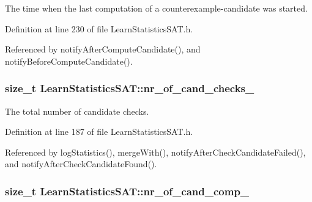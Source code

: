 The time when the last computation of a counterexample-\/candidate was started. 



Definition at line 230 of file Learn\-Statistics\-S\-A\-T.\-h.



Referenced by notify\-After\-Compute\-Candidate(), and notify\-Before\-Compute\-Candidate().

\hypertarget{classLearnStatisticsSAT_a1c3b6dff92cbcec06c944606c3555b64}{
\subsubsection[{nr\-\_\-of\-\_\-cand\-\_\-checks\-\_\-}]{\setlength{\rightskip}{0pt plus 5cm}size\-\_\-t Learn\-Statistics\-S\-A\-T\-::nr\-\_\-of\-\_\-cand\-\_\-checks\-\_\-\hspace{0.3cm}{\ttfamily [protected]}}}\label{classLearnStatisticsSAT_a1c3b6dff92cbcec06c944606c3555b64}


The total number of candidate checks. 



Definition at line 187 of file Learn\-Statistics\-S\-A\-T.\-h.



Referenced by log\-Statistics(), merge\-With(), notify\-After\-Check\-Candidate\-Failed(), and notify\-After\-Check\-Candidate\-Found().

\hypertarget{classLearnStatisticsSAT_a02de895c31e4c58396d5f07154e21561}{
\subsubsection[{nr\-\_\-of\-\_\-cand\-\_\-comp\-\_\-}]{\setlength{\rightskip}{0pt plus 5cm}size\-\_\-t Learn\-Statistics\-S\-A\-T\-::nr\-\_\-of\-\_\-cand\-\_\-comp\-\_\-\hspace{0.3cm}{\ttfamily [protected]}}}\label{classLearnStatisticsSAT_a02de895c31e4c58396d5f07154e21561}


